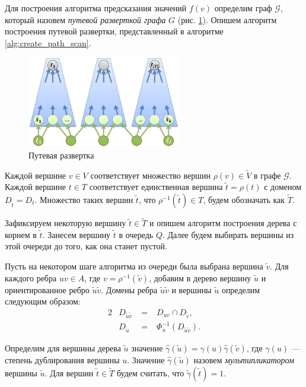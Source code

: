 \documentclass[../thesis.tex]{subfiles}
\begin{document}
Для построения алгоритма предсказания значений $f(v)$ определим граф $\mathcal{G}$, который назовем  \textit{путевой разверткой графа} $G$ (рис. \ref{fig:pathscan}).
Опишем алгоритм построения путевой развертки, представленный в алгоритме \ref{alg:create_path_scan}.

\begin{figure}
\centering
\includegraphics[width=0.6\textwidth]{figures/pathscan.jpg}
\caption{Путевая развертка} \label{fig:pathscan}
\end{figure}

Каждой вершине $v\in V$ соответствует множество вершин $\rho(v)\in \widetilde{V}$ в графе $\mathcal{G}$.
Каждой вершине $t\in T$ соответствует единственная вершина $\tilde{t} = \rho(t)$ с доменом $D_{\tilde{t}}= D_t$.
Множество таких вершин $\tilde{t}$, что $\rho^{-1}(\tilde{t})\in T$, будем обозначать как $\widetilde{T}$.

Зафиксируем некоторую вершину $\tilde{t}\in \widetilde{T}$ и опишем алгоритм построения дерева с корнем в $\tilde{t}$.
Занесем вершину $\tilde{t}$ в очередь $Q$.
Далее будем выбирать вершины из этой очереди до того, как она станет пустой.

Пусть на некотором шаге алгоритма из очереди была выбрана вершина $\tilde{v}$.
Для каждого ребра $uv\in A$, где $v = \rho^{-1}(\tilde{v})$, добавим в дерево вершину $\tilde{u}$ и ориентированное ребро $\tilde{u}\tilde{v}$.
Домены ребра $\tilde{u}\tilde{v}$ и вершины $\tilde{u}$ определим следующим образом:
\begin{alignat}{2}
    &D_{\tilde{u}\tilde{v}} &\;=\;& D_{uv}\cap D_{\tilde{v}}
    \label{eq:path_scan_arc_domain}, \\
    &D_{\tilde{u}} &\;=\;& \Phi^{-1}_u(D_{\tilde{u}\tilde{v}})
    \label{eq:path_scan_vertex_domain}.
\end{alignat}

Определим для вершины дерева $\tilde{u}$ значение $\hat{\gamma}(\tilde{u}) = \gamma(u)\hat{\gamma}(\tilde{v})$, где $\gamma(u)$ --- степень дублирования вершины $u$.
Значение $\hat{\gamma}(\tilde{u})$ назовем \textit{мультипликатором} вершины $\tilde{u}$.
Для вершин $\tilde{t}\in \widetilde{T}$ будем считать, что $\tilde{\gamma}(\tilde{t}) = 1$.
\end{document}
